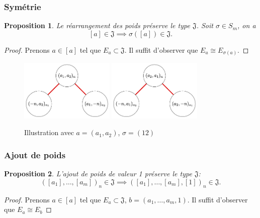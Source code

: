 \documentclass{article}
\newtheorem{proposition}{Proposition}
\newcommand{\J}{\mathfrak{J}}
\begin{document}
\subsubsection{Symétrie}

\begin{proposition}
    Le réarrangement des poids préserve le type $\J$. Soit $\sigma \in S_m$, on a
    \[ [a] \in \J \implies \sigma([a]) \in \J. \]
\end{proposition}

\begin{proof}
    Prenons $a \in [a]$ tel que $E_a \subset \J$. Il suffit d'observer que $E_a \cong E_{\sigma(a)}$.
\end{proof}

\begin{figure}[h]
    \caption{Illustration avec $a = (a_1, a_2)$, $\sigma = (12)$}
    \centering
    \includegraphics[width=0.4\textwidth]{abn}
    \includegraphics[width=0.4\textwidth]{ban}
\end{figure}

\subsubsection{Ajout de poids}

\begin{proposition}
    L'ajout de poids de valeur 1 préserve le type $\J$:
    \[ {([a_1], \dots, [a_m])}_n \in \J \implies {([a_1], \dots, [a_m], [1])}_n \in \J. \]
\end{proposition}

\begin{proof}
    Prenons $a \in [a]$ tel que $E_a \subset \J$, $b = (a_1, \dots, a_m, 1)$. Il suffit d'observer que $E_a \cong E_b$
\end{proof}
\end{document}
